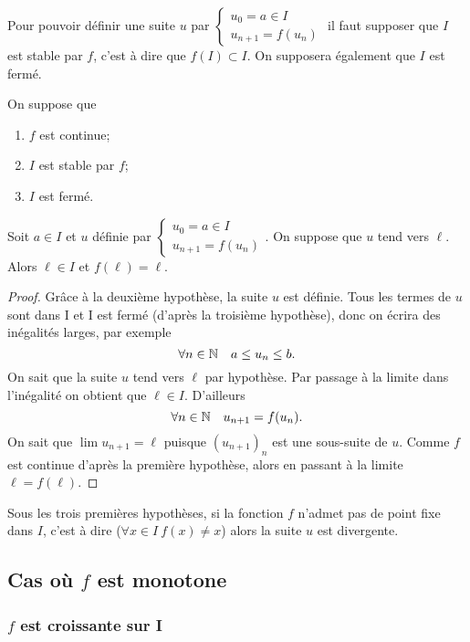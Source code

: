 Pour pouvoir définir une suite $u$ par $\begin{cases} u_0=a \in I \\ u_{n+1}=f(u_n) \end{cases}$ il faut supposer que $I$ est stable par $f$, c'est à dire que $f(I) \subset I$. On supposera également que $I$ est fermé.

\begin{prop}
  On suppose que 
  \begin{enumerate}
  \item $f$ est continue;
  \item $I$ est stable par $f$;
  \item $I$ est fermé.
  \end{enumerate}
  Soit $a \in I$ et $u$ définie par $\begin{cases} u_0=a \in I \\ u_{n+1}=f(u_n) \end{cases}$. On suppose que $u$ tend vers $\ell$. Alors $\ell \in I$ et $f(\ell)=\ell$.
\end{prop}
\begin{proof}
  Grâce à la deuxième hypothèse, la suite $u$ est définie. Tous les termes de $u$ sont dans I et I est fermé (d'après la troisième hypothèse), donc on écrira des inégalités larges, par exemple
  \begin{equation}
    \forall n \in \mathbb{N} \quad a \leq u_n \leq b.
  \end{equation}
  On sait que la suite $u$ tend vers $\ell$ par hypothèse. Par passage à la limite dans l'inégalité on obtient que $\ell \in I$. D'ailleurs
  \begin{equation}
    \forall n \in \mathbb{N} \quad u_{n+1}=f(u_n).
  \end{equation}
  On sait que $\lim u_{n+1}=\ell$ puisque $(u_{n+1})_n$ est une sous-suite de $u$. Comme $f$ est continue d'après la première hypothèse, alors en passant à la limite $\ell=f(\ell)$.
\end{proof}

Sous les trois premières hypothèses, si la fonction $f$ n'admet pas de point fixe dans $I$, c'est à dire ($\forall x \in I \ f(x) \neq x$) alors la suite $u$ est divergente.

\subsection{Cas où $f$ est monotone}

\subsubsection{$f$ est croissante sur I}


